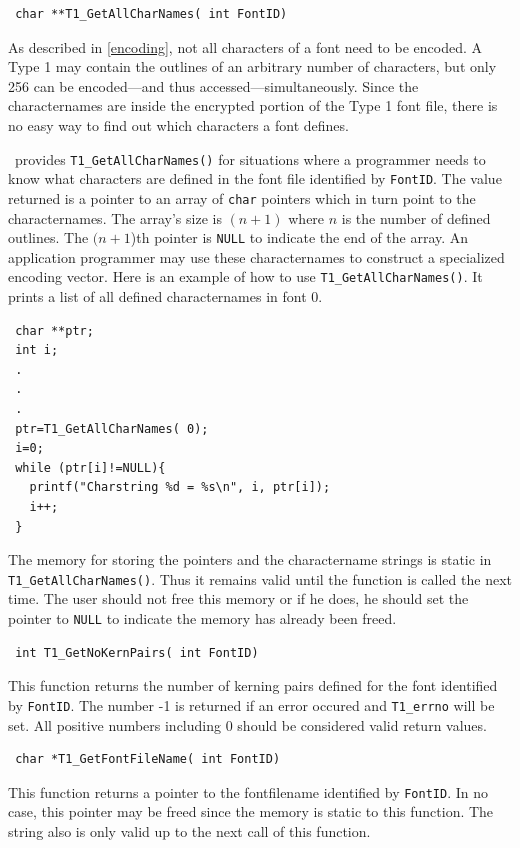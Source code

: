 \precorr
\begin{verbatim}
 char **T1_GetAllCharNames( int FontID)
\end{verbatim}\postcorr
As described in \ref{encoding}, not all characters of a font need to be
encoded. A Type 1 may contain the outlines of an arbitrary number of
characters, but only 256 can be encoded---and thus
accessed---simultaneously. Since the characternames are inside the encrypted
portion of 
the Type 1 font file, there is no easy way to find out which characters a font
defines. 

\tonelib\ provides \verb+T1_GetAllCharNames()+ for situations where a
programmer needs to know what characters are defined in the font file
identified by \verb+FontID+. The value returned is a pointer to an array of
\verb+char+ pointers which in turn point to the characternames.
The array's size is $(n+1)$ where $n$ is the number of defined outlines. The
$(n+1$)th pointer is \verb+NULL+ to indicate the end of the array.
An application programmer may use these characternames to construct a
specialized encoding vector. Here is an example of how to use
\verb+T1_GetAllCharNames()+. It prints a list of all defined characternames in
font 0.
\begin{verbatim}
 char **ptr;
 int i;
 .
 .
 .
 ptr=T1_GetAllCharNames( 0);
 i=0;
 while (ptr[i]!=NULL){
   printf("Charstring %d = %s\n", i, ptr[i]);
   i++;
 }
\end{verbatim}

The memory for storing the pointers and the charactername strings is static in\\
\verb+T1_GetAllCharNames()+. Thus it remains valid until the function is
called the next time. The user should not free this memory or if he does, he
should set the pointer to \verb+NULL+ to indicate the memory has already been
freed. 

\precorr
\begin{verbatim}
 int T1_GetNoKernPairs( int FontID)
\end{verbatim}\postcorr
This function returns the number of kerning pairs defined for the font
identified by \verb+FontID+. The number -1 is returned if an error occured and
\verb+T1_errno+ will be set. All positive numbers including 0 should be
considered valid return values.

\precorr
\begin{verbatim}
 char *T1_GetFontFileName( int FontID)
\end{verbatim}\postcorr
This function returns a pointer to the fontfilename identified by
\verb+FontID+. In no case, this pointer may be freed since the memory is
static to this function. The string also is only valid up to the next call of
this function.

